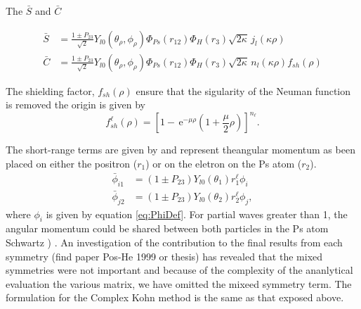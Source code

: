 \documentclass[preprint,showpacs,preprintnumbers,amsmath,amssymb]{revtex4}
\newcommand{\ee} {\,\text{e}}
\newcommand{\beq}{\begin{equation}}
\newcommand{\eeq}{\end{equation}}
\begin{document}
\noindent The $\bar{S}$ and $\bar{C}$ 

\begin{subequations}
\label{eq:PartialWaveSandCBar}
\begin{align}
\bar{S} &= \frac{1\pm P_{23}}{\sqrt{2}}Y_{l0}(\theta_\rho,\phi_\rho)\Phi_{Ps}\left(r_{12}\right) \Phi_H\left(r_3\right) \sqrt{2\kappa} \,j_l\left(\kappa\rho\right) \label{eq:PWaveSBar} \\
\bar{C} &=\frac{1\pm P_{23}}{\sqrt{2}}Y_{l0}(\theta_\rho,\phi_\rho)\Phi_{Ps}\left(r_{12}\right) \Phi_H\left(r_3\right) \sqrt{2\kappa} \,n_l\left(\kappa\rho\right) f_{sh}(\rho) \label{eq:PWaveCBar} 
\end{align}
\end{subequations}




\noindent The shielding factor, $f_{sh}(\rho)$ ensure that the sigularity of the Neuman function is removed the origin is given by
\beq
f^\ell_{sh}(\rho) = \left[1 - \ee^{-\mu \rho} \left(1+\frac{\mu}{2}\rho\right)\right]^{n_\ell}.
\label{eq:PartialWaveShielding}
\eeq


\noindent The short-range terms are given by and represent theangular momentum as been placed on either the positron ($r_1$) or on the eletron on the Ps atom ($r_2$).
\begin{subequations}
\label{eq:PartialWavePhiBar}
\begin{align}
\bar{\phi}_{i1} &= \left(1 \pm P_{23}\right) Y_{l0}(\theta_1) r^\ell_1 \phi_i \label{eq:PWavePhi1i}\\
\bar{\phi}_{j2} &= \left(1 \pm P_{23}\right) Y_{l0}(\theta_2) r^\ell_2 \phi_j \label{eq:PartialWavePhi2j},
\end{align}
\end{subequations}
where $\phi_i$ is given by equation \ref{eq:PhiDef}. For partial waves  greater than 1, the angular momentum could be shared between both particles in the Ps atom  Schwartz  ) . An investigation of the contribution to the final results from each symmetry  (find paper Pos-He 1999 or thesis) has revealed that the mixed symmetries were not important and because of the complexity of the ananlytical evaluation the various matrix, we have omitted the mixeed symmetry term.  The formulation for the Complex Kohn method is the same as that exposed above. 
\end{document}
